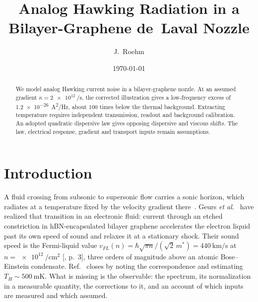 \documentclass[aps,prl,twocolumn,superscriptaddress,nofootinbib]{revtex4-2}
\begin{document}
\title{Analog Hawking Radiation in a Bilayer-Graphene de~Laval Nozzle}

\author{J.~Roehm}

\date{\today}

\begin{abstract}
We model analog Hawking current noise in a bilayer-graphene nozzle.
At an assumed gradient $\kappa=\SI{2e12}{\per\second}$, the corrected
illustration gives a low-frequency excess of
\SI{1.2e-26}{\ampere\squared/\hertz}, about $100$ times below the thermal
background. Extracting temperature requires independent transmission,
readout and background calibration. An adopted quadratic dispersive law
gives opposing dispersive and viscous shifts. The law, electrical response,
gradient and transport inputs remain assumptions.
\end{abstract}

\maketitle

\section{Introduction}

A fluid crossing from subsonic to supersonic flow carries a sonic horizon,
which radiates at a temperature fixed by the velocity gradient
there~\cite{Unruh1981,Visser1998,Bilic1999}. Geurs \emph{et
al.}~\cite{Geurs2025} have realized that transition in an electronic fluid:
current through an etched constriction in hBN-encapsulated bilayer graphene
accelerates the electron liquid past its own speed of sound and relaxes it
at a stationary shock. Their sound speed is the Fermi-liquid value
$v_{FL}(n) = \hbar\sqrt{\pi n}/(\sqrt{2}\,m^*) = \SI{440}{\kilo\meter/\second}$
at $n = \SI{e12}{\per\centi\meter\squared}$ [, p.~3],
three orders of magnitude above an atomic Bose--Einstein condensate.
Ref.~\cite{Geurs2025} closes by noting the correspondence and estimating
$T_H \sim \SI{500}{\milli\kelvin}$. What is missing is the observable: the
spectrum, its normalization in a measurable quantity, the corrections to
it, and an account of which inputs are measured and which assumed.
\end{document}
